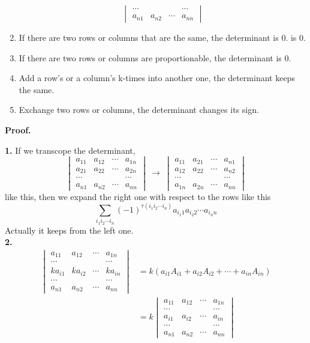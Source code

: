 \documentclass{article}
\begin{document}
\begin{enumerate}
$$\begin{vmatrix}
        \cdots &  &  & \cdots\\
        a_{n1} & a_{n2} & \cdots & a_{nn}
    \end{vmatrix}$$
    \item If there are two rows or columns that are the same, the determinant is 0.
    is 0. 
    \item If there are two rows or columns are proportionable, the determinant is 0.
    \item Add a row's or a column's k-times into another one, the determinant keeps the same. 
    \item Exchange two rows or columns, the determinant changes its sign.
\end{enumerate}

\textbf{Proof.}

\textbf{1.}
If we transcope the determinant,
$$
\begin{vmatrix}
    a_{11} & a_{12} & \cdots & a_{1n}\\
    a_{21} & a_{22} & \cdots & a_{2n}\\
    \cdots &  &  & \cdots\\
    a_{n1} & a_{n2} & \cdots & a_{nn}
\end{vmatrix}
\ \rightarrow\ 
\begin{vmatrix}
    a_{11} & a_{21} & \cdots & a_{n1}\\
    a_{12} & a_{22} & \cdots & a_{n2}\\
    \cdots &  &  & \cdots\\
    a_{1n} & a_{2n} & \cdots & a_{nn}
\end{vmatrix}$$
like this, then we expand the right one with respect to the rows like this 
$$ \sum_{i_{1}i_{2}\cdots i_{n}}(-1)^{\tau (i_{1}i_{2}\cdots i_{n})} a_{i_{1}1}a_{i_{2}2}\cdots a_{i_{n}n}$$
Actually it keeps from the left one.\\
\textbf{2.}
\begin{align*}
\begin{vmatrix}
    a_{11} & a_{12} & \cdots & a_{1n}\\
    \cdots &  &  & \cdots\\
    ka_{i1} & ka_{i2} & \cdots & ka_{in}\\
    \cdots &  &  & \cdots\\
    a_{n1} & a_{n2} & \cdots & a_{nn}
\end{vmatrix}
& = k \left( a_{i1}A_{i1} + a_{i2}A_{i2} + \cdots + a_{in}A_{in} \right) \\
& = k \begin{vmatrix}
    a_{11} & a_{12} & \cdots & a_{1n}\\
    \cdots &  &  & \cdots\\
    a_{i1} & a_{i2} & \cdots & a_{in}\\
    \cdots &  &  & \cdots\\
    a_{n1} & a_{n2} & \cdots & a_{nn}
\end{vmatrix}
\end{align*}
\end{document}
